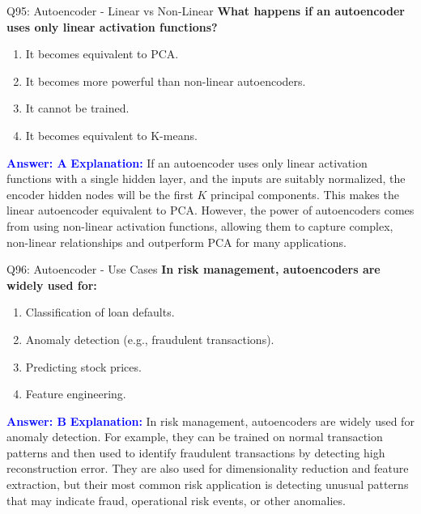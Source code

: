 \documentclass[8pt]{beamer}
\begin{document}
	\begin{frame}{Q95: Autoencoder - Linear vs Non-Linear}
		\fontsize{6.5}{7.5}\selectfont
		\textbf{What happens if an autoencoder uses only linear activation functions?}
		\begin{enumerate}
			\item It becomes equivalent to PCA.
			\item It becomes more powerful than non-linear autoencoders.
			\item It cannot be trained.
			\item It becomes equivalent to K-means.
		\end{enumerate}
		\vspace{0.1cm}
		\textcolor{blue}{\textbf{Answer: A}}
		\vspace{0.1cm}
		\textcolor{blue}{\textbf{Explanation:}} If an autoencoder uses only linear activation functions with a single hidden layer, and the inputs are suitably normalized, the encoder hidden nodes will be the first $K$ principal components. This makes the linear autoencoder equivalent to PCA. However, the power of autoencoders comes from using non-linear activation functions, allowing them to capture complex, non-linear relationships and outperform PCA for many applications.
	\end{frame}
	
	\begin{frame}{Q96: Autoencoder - Use Cases}
		\fontsize{6.5}{7.5}\selectfont
		\textbf{In risk management, autoencoders are widely used for:}
		\begin{enumerate}
			\item Classification of loan defaults.
			\item Anomaly detection (e.g., fraudulent transactions).
			\item Predicting stock prices.
			\item Feature engineering.
		\end{enumerate}
		\vspace{0.1cm}
		\textcolor{blue}{\textbf{Answer: B}}
		\vspace{0.1cm}
		\textcolor{blue}{\textbf{Explanation:}} In risk management, autoencoders are widely used for anomaly detection. For example, they can be trained on normal transaction patterns and then used to identify fraudulent transactions by detecting high reconstruction error. They are also used for dimensionality reduction and feature extraction, but their most common risk application is detecting unusual patterns that may indicate fraud, operational risk events, or other anomalies.
	\end{frame}
	
\end{document}
